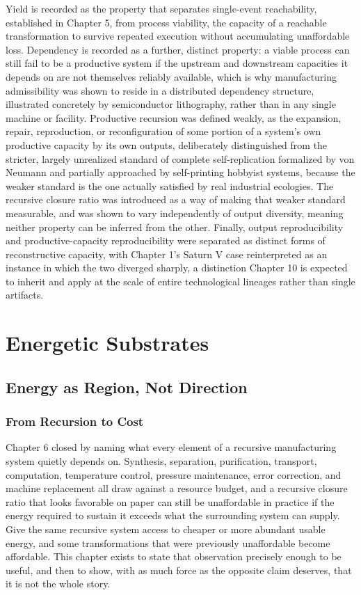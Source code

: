 \documentclass[11pt]{book}
\begin{document}
Yield is recorded as the property that separates single-event reachability, established in Chapter 5, from process viability, the capacity of a reachable transformation to survive repeated execution without accumulating unaffordable loss. Dependency is recorded as a further, distinct property: a viable process can still fail to be a productive system if the upstream and downstream capacities it depends on are not themselves reliably available, which is why manufacturing admissibility was shown to reside in a distributed dependency structure, illustrated concretely by semiconductor lithography, rather than in any single machine or facility. Productive recursion was defined weakly, as the expansion, repair, reproduction, or reconfiguration of some portion of a system's own productive capacity by its own outputs, deliberately distinguished from the stricter, largely unrealized standard of complete self-replication formalized by von Neumann and partially approached by self-printing hobbyist systems, because the weaker standard is the one actually satisfied by real industrial ecologies. The recursive closure ratio was introduced as a way of making that weaker standard measurable, and was shown to vary independently of output diversity, meaning neither property can be inferred from the other. Finally, output reproducibility and productive-capacity reproducibility were separated as distinct forms of reconstructive capacity, with Chapter 1's Saturn V case reinterpreted as an instance in which the two diverged sharply, a distinction Chapter 10 is expected to inherit and apply at the scale of entire technological lineages rather than single artifacts.


\part{Energetic Substrates}


\chapter{Energy as Region, Not Direction}

\section{From Recursion to Cost}

Chapter 6 closed by naming what every element of a recursive manufacturing system quietly depends on. Synthesis, separation, purification, transport, computation, temperature control, pressure maintenance, error correction, and machine replacement all draw against a resource budget, and a recursive closure ratio that looks favorable on paper can still be unaffordable in practice if the energy required to sustain it exceeds what the surrounding system can supply. Give the same recursive system access to cheaper or more abundant usable energy, and some transformations that were previously unaffordable become affordable. This chapter exists to state that observation precisely enough to be useful, and then to show, with as much force as the opposite claim deserves, that it is not the whole story.
\end{document}

